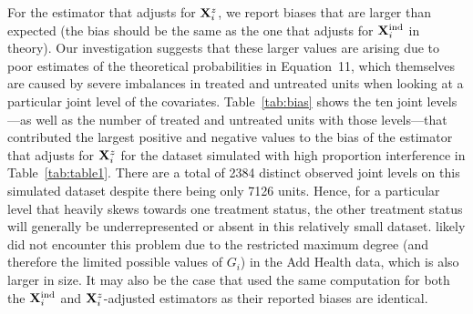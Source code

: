 \documentclass[10pt]{article}
\begin{document}
For the estimator that adjusts for $\mathbf{X}^z_i$, we report biases that are larger than expected (the bias should be the same as the one that adjusts for $\mathbf{X}^{\text{ind}}_i$ in theory). Our investigation suggests that these larger values are arising due to poor estimates of the theoretical probabilities in Equation~11, which themselves are caused by severe imbalances in treated and untreated units when looking at a particular joint level of the covariates. Table~\ref{tab:bias} shows the ten joint levels---as well as the number of treated and untreated units with those levels---that contributed the largest positive and negative values to the bias of the estimator that adjusts for $\mathbf{X}_i^z$ for the dataset simulated with high proportion interference in Table~\ref{tab:table1}. There are a total of 2384 distinct observed joint levels on this simulated dataset despite there being only 7126 units. Hence, for a particular level that heavily skews towards one treatment status, the other treatment status will generally be underrepresented or absent in this relatively small dataset. \citeauthor{Forastiere:2021} likely did not encounter this problem due to the restricted maximum degree (and therefore the limited possible values of $G_i$) in the Add Health data, which is also larger in size. It may also be the case that \citeauthor{Forastiere:2021} used the same computation for both the $\mathbf{X}^{\text{ind}}_i$ and $\mathbf{X}_i^z$-adjusted estimators as their reported biases are identical.
\end{document}
